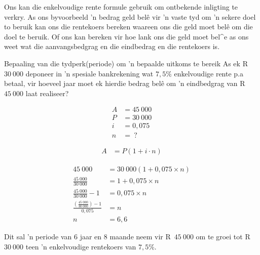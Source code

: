 Ons kan die enkelvoudige rente formule gebruik om ontbekende inligting te verkry. As ons byvoorbeeld 'n bedrag geld bel\^e vir 'n vaste tyd om 'n sekere doel to beruik kan ons die rentekoers bereken waareen ons die geld moet bel\^e om die doel te beruik. Of ons kan bereken vir hoe lank ons die geld moet bel^e as ons weet wat die aanvangsbedgrag en die eindbedrag en die rentekoers is. 


\begin{wex}{Bepaaling van die tydperk(periode) om 'n b}{epaalde uitkoms te bereik
    As ek  R~$30~000$ deponeer in ’n spesiale
bankrekening wat $7,5\%$ enkelvoudige rente p.a betaal, vir hoeveel jaar moet
ek hierdie bedrag belê om 'n eindbedgrag van R~$45~000$ laat realiseer?}{

    \begin{align*}
	A &= 45~000\\
	P &= 30~000\\
	i &= 0,075\\
	n &= ~?
    \end{align*}

    \begin{align*}
	A &= P(1 + i \cdot n)
    \end{align*}

    \begin{align*}
	45~000 &= 30~000(1 + 0,075 \times n)\\
	\frac{45~000}{30~000} &= 1 + 0,075 \times n\\
	\frac{45~000}{30~000} -1 &= 0,075 \times n\\
	\frac{(\frac{45~000}{30~000}) -1}{0,075} &= n\\
	n &= 6,6
    \end{align*}

    Dit sal ’n periode van 6 jaar en 8 maande neem vir R~$45~000$ om te groei tot R~$30~000$ teen ’n enkelvoudige rentekoers van $7,5\%$.
    }
\end{wex}




